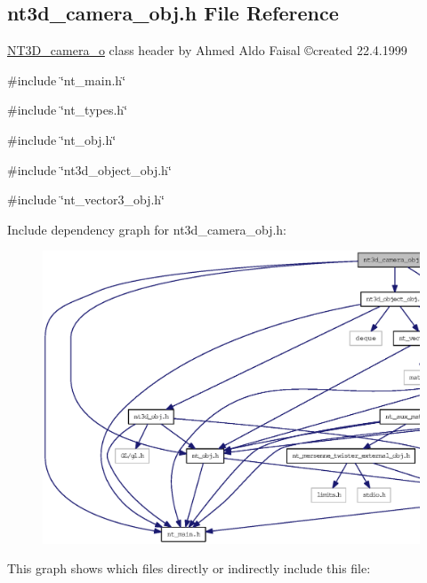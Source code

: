 \subsection{nt3d\_\-camera\_\-obj.h File Reference}
\label{nt3d__camera__obj_8h}



\begin{DoxyItemize}
\item \hyperlink{class_n_t3_d__camera__o}{NT3D\_\-camera\_\-o} class header by Ahmed Aldo Faisal \copyright created 22.4.1999 
\end{DoxyItemize} 


{\ttfamily \#include \char`\"{}nt\_\-main.h\char`\"{}}\par
{\ttfamily \#include \char`\"{}nt\_\-types.h\char`\"{}}\par
{\ttfamily \#include \char`\"{}nt\_\-obj.h\char`\"{}}\par
{\ttfamily \#include \char`\"{}nt3d\_\-object\_\-obj.h\char`\"{}}\par
{\ttfamily \#include \char`\"{}nt\_\-vector3\_\-obj.h\char`\"{}}\par
Include dependency graph for nt3d\_\-camera\_\-obj.h:
\nopagebreak
\begin{figure}[H]
\begin{center}
\leavevmode
\includegraphics[width=400pt]{nt3d__camera__obj_8h__incl}
\end{center}
\end{figure}
This graph shows which files directly or indirectly include this file:
